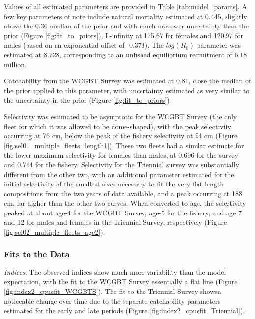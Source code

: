 \documentclass[12pt,]{article}
\begin{document}
Values of all estimated parameters are provided in Table
\ref{tab:model_params}. A few key parameters of note include natural
mortality estimated at 0.445, slightly above the 0.36 median of the
prior and with much narrower uncertainty than the prior (Figure
\ref{fig:fit_to_priors}), L-infinity at 175.67 for females and 120.97
for males (based on an exponential offset of -0.373). The \(log(R_0)\)
parameter was estimated at 8.728, corresponding to an unfished
equilibrium recruitment of 6.18 million.

Catchability from the WCGBT Survey was estimated at 0.81, close the
median of the prior applied to this parameter, with uncertainty
estimated as very similar to the uncertainty in the prior (Figure
\ref{fig:fit_to_priors}).

Selectivity was estimated to be asymptotic for the WCGBT Survey (the
only fleet for which it was allowed to be dome-shaped), with the peak
selectivity occurring at 76 cm, below the peak of the fishery
selectivity at 94 cm (Figure \ref{fig:sel01_multiple_fleets_length1}).
These two fleets had a similar estimate for the lower maximum
selectivity for females than males, at 0.696 for the survey and 0.744
for the fishery. Selectivity for the Triennial survey was substantially
different from the other two, with an additional parameter estimated for
the initial selectivity of the smallest sizes necessary to fit the very
flat length compositions from the two years of data available, and a
peak occurring at 188 cm, far higher than the other two curves. When
converted to age, the selectivity peaked at about age-4 for the WCGBT
Survey, age-5 for the fishery, and age 7 and 12 for males and females in
the Triennial Survey, respectively (Figure
\ref{fig:sel02_multiple_fleets_age2}).

\hypertarget{fits-to-the-data}{%
\subsubsection{Fits to the Data}\label{fits-to-the-data}}

\emph{Indices.} The observed indices show much more variability than the
model expectation, with the fit to the WCGBT Survey essentially a flat
line (Figure \ref{fig:index2_cpuefit_WCGBTS}). The fit to the Triennial
Survey showsa noticeable change over time due to the separate
catchability parameters estimated for the early and late periods (Figure
\ref{fig:index2_cpuefit_Triennial}).
\end{document}
